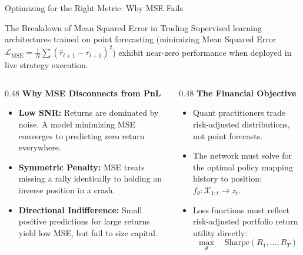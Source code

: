 \documentclass[10pt]{beamer}
\begin{document}
\begin{frame}{Optimizing for the Right Metric: Why MSE Fails}
  \begin{block}{The Breakdown of Mean Squared Error in Trading}
    Supervised learning architectures trained on point forecasting (minimizing Mean Squared Error $\mathcal{L}_{\text{MSE}} = \frac{1}{N}\sum (\hat{r}_{t+1} - r_{t+1})^2$) exhibit near-zero performance when deployed in live strategy execution.
  \end{block}
  \vspace{0.1cm}
  \begin{columns}[t]
    \begin{column}{0.48\textwidth}
      \textbf{\scriptsize Why MSE Disconnects from PnL}
      \begin{itemize}\scriptsize
        \item \textbf{Low SNR:} Returns are dominated by noise. A model minimizing MSE converges to predicting zero return everywhere.
        \item \textbf{Symmetric Penalty:} MSE treats missing a rally identically to holding an inverse position in a crash.
        \item \textbf{Directional Indifference:} Small positive predictions for large returns yield low MSE, but fail to size capital.
      \end{itemize}
    \end{column}
    \begin{column}{0.48\textwidth}
      \textbf{\scriptsize The Financial Objective}
      \begin{itemize}\scriptsize
        \item Quant practitioners trade risk-adjusted distributions, not point forecasts.
        \item The network must solve for the optimal policy mapping history to position: $f_\theta: \mathcal{X}_{1:t} \to z_t$.
        \item Loss functions must reflect risk-adjusted portfolio return utility directly:
        \begin{equation*}
          \max_\theta \quad \text{Sharpe}(R_1, \dots, R_T)
        \end{equation*}
      \end{itemize}
    \end{column}
  \end{columns}
\end{frame}
\end{document}
